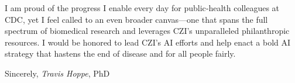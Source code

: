 \documentclass[]{scrartcl}
\begin{document}
\begin{cleanCV}
I am proud of the progress I enable every day for public‑health colleagues at CDC, yet I feel called to an even broader canvas—one that spans the full spectrum of biomedical research and leverages CZI’s unparalleled philanthropic resources. I would be honored to lead CZI’s AI efforts and help enact a bold AI strategy that hastens the end of disease and for all people fairly.

  Sincerely,\newline
  \emph{Travis Hoppe}, PhD
  
\end{cleanCV}
\end{document}
